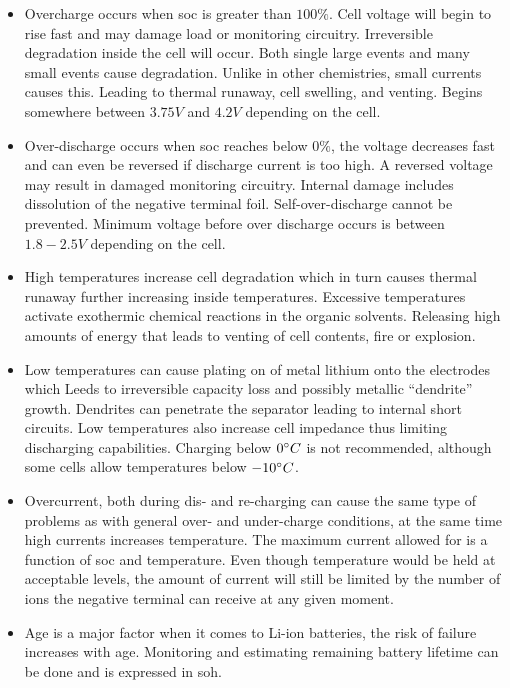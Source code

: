 \begin{itemize}
\item Overcharge occurs when \gls{soc} is greater than $100\%$. Cell voltage will begin to rise fast and may damage load or monitoring circuitry. Irreversible degradation inside the cell will occur. Both single large events and many small events cause degradation. Unlike in other chemistries, small currents causes this. Leading to thermal runaway, cell swelling, and venting. Begins somewhere between $3.75V$ and $4.2V$ depending on the cell.
\item Over-discharge occurs when \gls{soc} reaches below $0\%$, the voltage decreases fast and can even be reversed if discharge current is too high. A reversed voltage may result in damaged monitoring circuitry. Internal damage includes dissolution of the negative terminal foil. Self-over-discharge cannot be prevented. Minimum voltage before over discharge occurs is between $1.8-2.5V$ depending on the cell.
\item High temperatures increase cell degradation which in turn causes thermal runaway further increasing inside temperatures. Excessive temperatures activate exothermic chemical reactions in the organic solvents. Releasing high amounts of energy that leads to venting of cell contents, fire or explosion.
\item Low temperatures can cause plating on of metal lithium onto the electrodes which Leeds to irreversible capacity loss and possibly metallic “dendrite” growth. Dendrites can penetrate the separator leading to internal short circuits. Low temperatures also increase cell impedance thus limiting discharging capabilities. Charging below $0\degree C$ is not recommended, although some cells allow temperatures below $-10\degree C$.
\item Overcurrent, both during dis- and re-charging can cause the same type of problems as with general over- and under-charge conditions, at the same time high currents increases temperature. The maximum current allowed for is a function of \gls{soc} and temperature. Even though temperature would be held at acceptable levels, the amount of current will still be limited by the number of ions the negative terminal can receive at any given moment.
\item Age is a major factor when it comes to Li-ion batteries, the risk of failure increases with age. Monitoring and estimating remaining battery lifetime can be done and is expressed in \gls{soh}.
\end{itemize}

